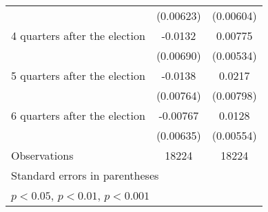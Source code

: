 \begin{table}[htbp]
\begin{tabular}{l*{2}{c}}
                    &   (0.00623)         &   (0.00604)         \\
[1em]
 4 quarters after the election&     -0.0132         &     0.00775         \\
                    &   (0.00690)         &   (0.00534)         \\
[1em]
 5 quarters after the election&     -0.0138         &      0.0217\sym{**} \\
                    &   (0.00764)         &   (0.00798)         \\
[1em]
 6 quarters after the election&    -0.00767         &      0.0128\sym{*}  \\
                    &   (0.00635)         &   (0.00554)         \\
\hline
Observations        &       18224         &       18224         \\
\hline\hline
\multicolumn{3}{l}{\footnotesize Standard errors in parentheses}\\
\multicolumn{3}{l}{\footnotesize \sym{*} \(p<0.05\), \sym{**} \(p<0.01\), \sym{***} \(p<0.001\)}\\
\end{tabular}
\end{table}
